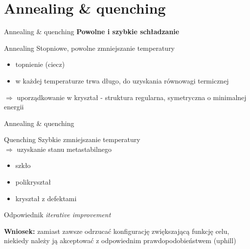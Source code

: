 \section{Annealing \& quenching}


	\begin{frame}{Annealing \& quenching}
		\textbf{Powolne i szybkie schładzanie}
		\begin{block}{Annealing}
			Stopniowe, powolne zmniejszanie temperatury
			\begin{itemize}
				\item topnienie (ciecz)
				\item w każdej temperaturze trwa długo, do uzyskania równowagi termicznej
			\end{itemize}
			$\Rightarrow$ uporządkowanie w kryształ - struktura regularna, symetryczna o minimalnej energii
		\end{block}
	\end{frame}


	\begin{frame}{Annealing \& quenching}
		\begin{block}{Quenching}
			Szybkie zmniejszanie temperatury \\
			$\Rightarrow$ uzyskanie stanu metastabilnego
			\begin{itemize}
				\item szkło
				\item polikryształ
				\item kryształ z defektami
			\end{itemize}
			Odpowiednik \textit{iterative improvement}
		\end{block}
		\textbf{Wniosek:} zamiast zawsze odrzucać konfigurację zwiększającą funkcję celu, niekiedy należy ją akceptować z odpowiednim prawdopodobieństwem (uphill)
	\end{frame}
